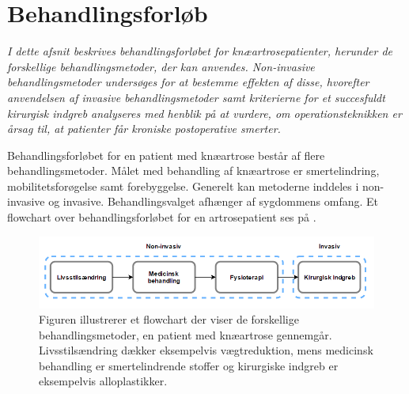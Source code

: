 \section{Behandlingsforløb}
\textit{I dette afsnit beskrives behandlingsforløbet for knæartrosepatienter, herunder de forskellige behandlingsmetoder, der kan anvendes. Non-invasive behandlingsmetoder undersøges for at bestemme effekten af disse, hvorefter anvendelsen af invasive behandlingsmetoder samt kriterierne for et succesfuldt kirurgisk indgreb analyseres med henblik på at vurdere, om operationsteknikken er årsag til, at patienter får kroniske postoperative smerter.}

Behandlingsforløbet for en patient med knæartrose består af flere behandlingsmetoder. Målet med behandling af knæartrose er smertelindring, mobilitetsforøgelse samt forebyggelse. Generelt kan metoderne inddeles i non-invasive og invasive. Behandlingsvalget afhænger af sygdommens omfang. \citep{Lind2016b} Et flowchart over behandlingsforløbet for en artrosepatient ses på . 

\begin{figure}[H]
	\centering
	\includegraphics[width=1\textwidth]{figures/bProblemanalyse/flowchart_behandlingsforloeb_rettet.png}
	\caption{Figuren illustrerer et flowchart der viser de forskellige behandlingsmetoder, en patient med knæartrose gennemgår. Livsstilsændring dækker eksempelvis vægtreduktion, mens medicinsk behandling er smertelindrende stoffer og kirurgiske indgreb er eksempelvis alloplastikker. \citep{Lind2016b}}
	\label{fig:flow_behandlingsfaser}
\end{figure}\vspace{-.25cm}



